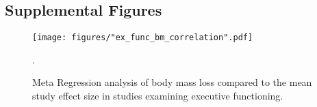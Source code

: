 \begin{appendices}
%		


\chapter{Supplemental Figures}

\begin{figure}
	\centering
	\texttt{[image: figures/"ex\_func\_bm\_correlation".pdf]}
	\caption{Meta Regression analysis of body mass loss compared to the mean study effect size in studies examining executive functioning.}.
	\label{fig:ex_func_bm_correlation}
\end{figure}


\end{appendices}
